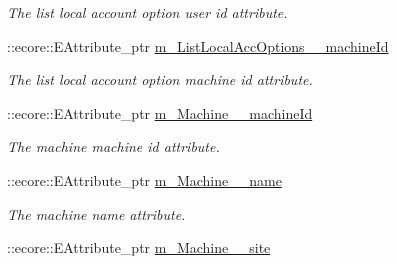 \begin{DoxyCompactItemize}
\begin{DoxyCompactList}\small\item\em The list local account option user id attribute. \item\end{DoxyCompactList}\item 
\hypertarget{classUMS__Data_1_1UMS__DataPackage_a4bc30bbf8e74a01132fd0ad753a5e06a}{
::ecore::EAttribute\_\-ptr \hyperlink{classUMS__Data_1_1UMS__DataPackage_a4bc30bbf8e74a01132fd0ad753a5e06a}{m\_\-ListLocalAccOptions\_\-\_\-machineId}}
\label{classUMS__Data_1_1UMS__DataPackage_a4bc30bbf8e74a01132fd0ad753a5e06a}

\begin{DoxyCompactList}\small\item\em The list local account option machine id attribute. \item\end{DoxyCompactList}\item 
\hypertarget{classUMS__Data_1_1UMS__DataPackage_af81079a435b87dd1057b5350379c5853}{
::ecore::EAttribute\_\-ptr \hyperlink{classUMS__Data_1_1UMS__DataPackage_af81079a435b87dd1057b5350379c5853}{m\_\-Machine\_\-\_\-machineId}}
\label{classUMS__Data_1_1UMS__DataPackage_af81079a435b87dd1057b5350379c5853}

\begin{DoxyCompactList}\small\item\em The machine machine id attribute. \item\end{DoxyCompactList}\item 
\hypertarget{classUMS__Data_1_1UMS__DataPackage_a83a1049c55b40cae1bd302ee8f02fd23}{
::ecore::EAttribute\_\-ptr \hyperlink{classUMS__Data_1_1UMS__DataPackage_a83a1049c55b40cae1bd302ee8f02fd23}{m\_\-Machine\_\-\_\-name}}
\label{classUMS__Data_1_1UMS__DataPackage_a83a1049c55b40cae1bd302ee8f02fd23}

\begin{DoxyCompactList}\small\item\em The machine name attribute. \item\end{DoxyCompactList}\item 
\hypertarget{classUMS__Data_1_1UMS__DataPackage_af338c47bd9ce601a91e2a9eb377d7f3d}{
::ecore::EAttribute\_\-ptr \hyperlink{classUMS__Data_1_1UMS__DataPackage_af338c47bd9ce601a91e2a9eb377d7f3d}{m\_\-Machine\_\-\_\-site}}
\label{classUMS__Data_1_1UMS__DataPackage_af338c47bd9ce601a91e2a9eb377d7f3d}


\end{DoxyCompactItemize}
